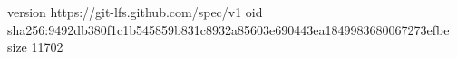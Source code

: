 version https://git-lfs.github.com/spec/v1
oid sha256:9492db380f1c1b545859b831c8932a85603e690443ea1849983680067273efbe
size 11702
